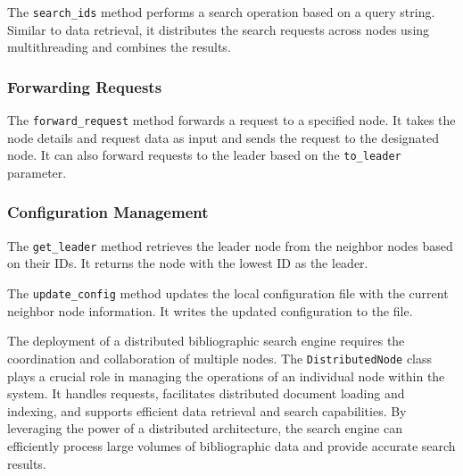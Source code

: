 \documentclass{article}
\begin{document}
The \texttt{search\_ids} method performs a search operation based on a query string. Similar to 
data retrieval, it distributes the search requests across nodes using multithreading and 
combines the results.

\subsubsection*{Forwarding Requests}

The \texttt{forward\_request} method forwards a request to a specified node. It takes the node 
details and request data as input and sends the request to the designated node. It can also 
forward requests to the leader based on the \texttt{to\_leader} parameter.

\subsubsection*{Configuration Management}

The \texttt{get\_leader} method retrieves the leader node from the neighbor nodes based on their 
IDs. It returns the node with the lowest ID as the leader.


The \texttt{update\_config} method updates the local configuration file with the current 
neighbor node information. It writes the updated configuration to the file.


The deployment of a distributed bibliographic search engine requires the coordination and 
collaboration of multiple nodes. The \texttt{DistributedNode} class plays a crucial role in 
managing the operations of an individual node within the system. It handles requests, 
facilitates distributed document loading and indexing, and supports efficient data retrieval and 
search capabilities. By leveraging the power of a distributed architecture, the search engine 
can efficiently process large volumes of bibliographic data and provide accurate search results.
\end{document}
